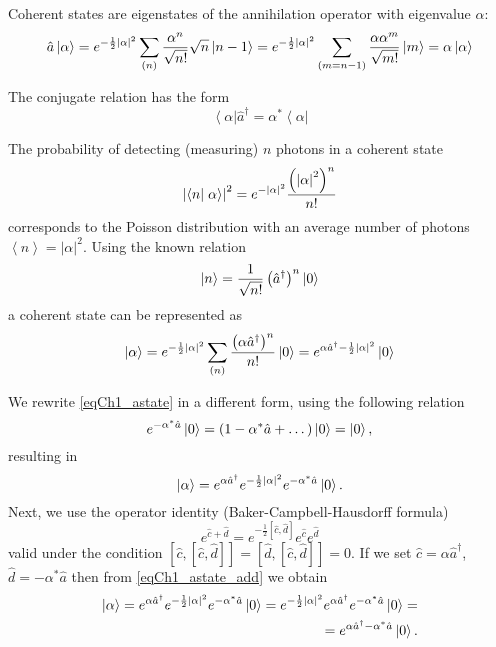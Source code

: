 Coherent states are eigenstates of the annihilation operator with eigenvalue $\alpha$:
\begin{equation}
\hat{a}\left|\alpha\right> = e^{-\frac{1}{2} \left|\alpha\right|^2}
\sum_{(n)} \frac{\alpha^n}{\sqrt{n!}}\sqrt{n}\ket{n - 1} = 
e^{-\frac{1}{2} \left|\alpha\right|^2}
\sum_{(m = n - 1)} \frac{\alpha \alpha^m}{\sqrt{m!}}\ket{m} = 
\alpha\left|\alpha\right>
\end{equation}

The conjugate relation has the form
\begin{equation}
\left<\alpha\right|\hat{a}^{\dag} =  
\alpha^{*}\left<\alpha\right|
\end{equation}

The probability of detecting (measuring) $n$ photons in a coherent state
\begin{equation}
\left|\bra{n}\left.\alpha\right>\right|^2 =
e^{-\left|\alpha\right|^2}
\frac{\left(\left|\alpha\right|^2\right)^n}{n!}
\label{eqCh1_PuassonCoh}
\end{equation}
corresponds to the Poisson distribution
with an average number of photons  
$\left<n\right> = \left|\alpha\right|^2$. Using the known relation
\begin{equation}
\ket{n} = \frac{1}{\sqrt{n!}}
\left(\hat{a}^{\dag}\right)^n\ket{0}
\label{eqCh1_nstate}
\end{equation}
a coherent state can be represented as
\begin{equation}
\left|\alpha\right> = e^{-\frac{1}{2} \left|\alpha\right|^2}\sum_{(n)}
\frac{\left(\alpha \hat{a}^{\dag}\right)^n}{n!}\ket{0} = 
e^{\alpha \hat{a}^{\dag} -
  \frac{1}{2}\left|\alpha\right|^2}\ket{0}
\label{eqCh1_astate}
\end{equation}

We rewrite \eqref{eqCh1_astate} in a different form, using the following relation
\[
e^{- \alpha^{*} \hat{a}} \ket{0} = \left(1 - \alpha^{*} \hat{a} +
\dots\right) \ket{0} = \ket{0},
\]
resulting in
\begin{equation}
\left|\alpha\right> = 
e^{\alpha \hat{a}^{\dag}} 
e^{-\frac{1}{2}\left|\alpha\right|^2}
e^{- \alpha^{*} \hat{a}} 
\ket{0}.
\label{eqCh1_astate_add}
\end{equation}
Next, we use the operator identity (Baker-Campbell-Hausdorff formula)
\begin{equation}
e^{\hat{c} + \hat{d}} = e^{- \frac{1}{2}\left[\hat{c},
    \hat{d}\right]}e^{\hat{c}} e^{\hat{d}} 
\label{eqPart1Ch1_BeikerHausdorf}
\end{equation}
valid under the condition  
$\left[\hat{c},\left[\hat{c}, \hat{d}\right]\right] =
\left[\hat{d},\left[\hat{c}, \hat{d}\right]\right] = 0$.
If we set $\hat{c} = \alpha\hat{a}^{\dag}$, $\hat{d} = -\alpha^*\hat{a}$
then from \eqref{eqCh1_astate_add} we obtain 
\begin{eqnarray}
\left|\alpha\right> =  
e^{\alpha \hat{a}^{\dag}} 
e^{-\frac{1}{2}\left|\alpha\right|^2}
e^{- \alpha^{*} \hat{a}} 
\ket{0} =
e^{-\frac{1}{2}\left|\alpha\right|^2}
e^{\alpha \hat{a}^{\dag}} 
e^{- \alpha^{*} \hat{a}} 
\ket{0} = 
\nonumber \\
=
e^{\alpha \hat{a}^{\dag} - \alpha^{*} \hat{a}}\ket{0}.
\label{eqCh1_astate4squeezed}
\end{eqnarray}

